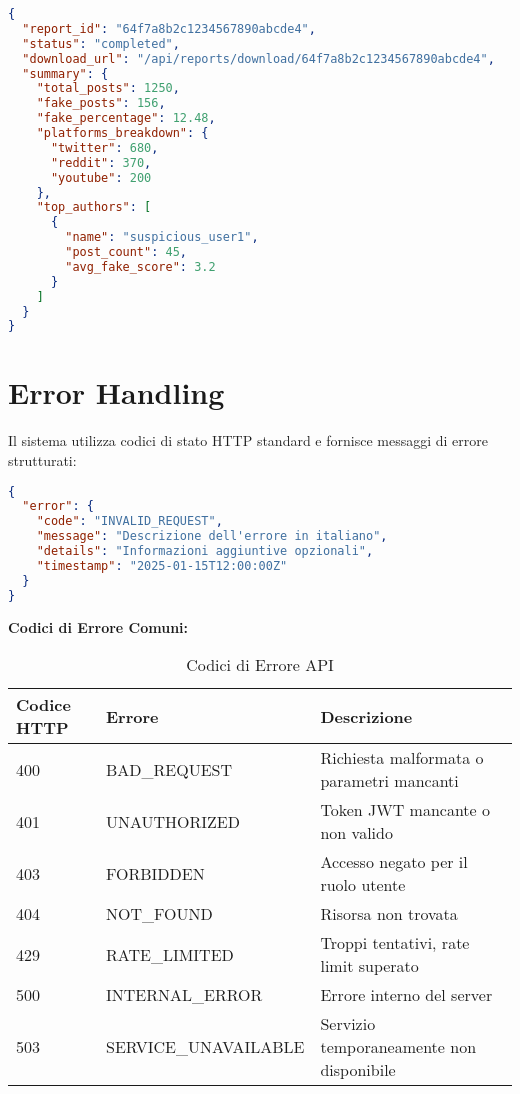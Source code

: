 \documentclass[12pt,a4paper]{report}
\begin{document}
\begin{lstlisting}[language=json, caption=Response (200 OK)]
{
  "report_id": "64f7a8b2c1234567890abcde4",
  "status": "completed",
  "download_url": "/api/reports/download/64f7a8b2c1234567890abcde4",
  "summary": {
    "total_posts": 1250,
    "fake_posts": 156,
    "fake_percentage": 12.48,
    "platforms_breakdown": {
      "twitter": 680,
      "reddit": 370,
      "youtube": 200
    },
    "top_authors": [
      {
        "name": "suspicious_user1",
        "post_count": 45,
        "avg_fake_score": 3.2
      }
    ]
  }
}
\end{lstlisting}

\section{Error Handling}

Il sistema utilizza codici di stato HTTP standard e fornisce messaggi di errore strutturati:

\begin{lstlisting}[language=json, caption=Error Response Format]
{
  "error": {
    "code": "INVALID_REQUEST",
    "message": "Descrizione dell'errore in italiano",
    "details": "Informazioni aggiuntive opzionali",
    "timestamp": "2025-01-15T12:00:00Z"
  }
}
\end{lstlisting}

\textbf{Codici di Errore Comuni:}
\begin{table}[H]
\centering
\begin{tabular}{@{}lll@{}}
\toprule
\textbf{Codice HTTP} & \textbf{Errore} & \textbf{Descrizione} \\
\midrule
400 & BAD\_REQUEST & Richiesta malformata o parametri mancanti \\
401 & UNAUTHORIZED & Token JWT mancante o non valido \\
403 & FORBIDDEN & Accesso negato per il ruolo utente \\
404 & NOT\_FOUND & Risorsa non trovata \\
429 & RATE\_LIMITED & Troppi tentativi, rate limit superato \\
500 & INTERNAL\_ERROR & Errore interno del server \\
503 & SERVICE\_UNAVAILABLE & Servizio temporaneamente non disponibile \\
\bottomrule
\end{tabular}
\caption{Codici di Errore API}
\label{tab:api-errors}
\end{table}
\end{document}
